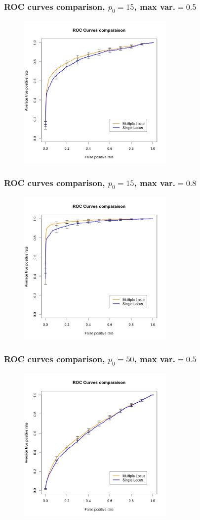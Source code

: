 \documentclass{beamer}
\begin{document}
\begin{frame}
\frametitle{ROC curves comparison, $p_0 = 15$, max var.$=0.5$}
\begin{figure}
\includegraphics[width=3in]{images/ROC_Comp_p0_15_var_0_5.jpeg}
\end{figure}
\end{frame}
\begin{frame}
\frametitle{ROC curves comparison, $p_0 = 15$, max var.$=0.8$}
\begin{figure}
\includegraphics[width=3in]{images/ROC_Comp_p0_15_var_0_8.jpeg}
\end{figure}
\end{frame}
\begin{frame}
\frametitle{ROC curves comparison, $p_0 = 50$, max var.$=0.5$}
\begin{figure}
\includegraphics[width=3in]{images/ROC_Comp_p0_50_var_0_5.jpeg}
\end{figure}
\end{frame}
\end{document}
